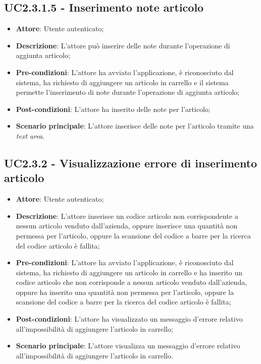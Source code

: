 \subsection{UC2.3.1.5 - Inserimento note articolo}

\begin{itemize}
	\item \textbf{Attore}: Utente autenticato;
	\item \textbf{Descrizione}: L'attore può inserire delle note durante l'operazione di aggiunta articolo;
	\item \textbf{Pre-condizioni}: L'attore ha avviato l'applicazione, è riconosciuto dal sistema, ha richiesto di aggiungere un articolo in carrello e il sistema permette l'inserimento di note durante l'operazione di aggiunta articolo;
	\item \textbf{Post-condizioni}: L'attore ha inserito delle note per l'articolo;
	\item \textbf{Scenario principale}: L'attore inserisce delle note per l'articolo tramite una \textit{text area}.
\end{itemize}

\subsection{UC2.3.2 - Visualizzazione errore di inserimento articolo}

\begin{itemize}
	\item \textbf{Attore}: Utente autenticato;
	\item \textbf{Descrizione}: L'attore inserisce un codice articolo non corrispondente a nessun articolo venduto dall'azienda, oppure inserisce una quantità non permessa per l'articolo, oppure la scansione del codice a barre per la ricerca del codice articolo è fallita;
	\item \textbf{Pre-condizioni}: L'attore ha avviato l'applicazione, è riconosciuto dal sistema, ha richiesto di aggiungere un articolo in carrello e ha inserito un codice articolo che non corrisponde a nessun articolo venduto dall'azienda, oppure ha inserito una quantità non permessa per l'articolo, oppure la scansione del codice a barre per la ricerca del codice articolo è fallita;
	\item \textbf{Post-condizioni}: L'attore ha visualizzato un messaggio d'errore relativo all'impossibilità di aggiungere l'articolo in carrello;
	\item \textbf{Scenario principale}: L'attore visualizza un messaggio d'errore relativo all'impossibilità di aggiungere l'articolo in carrello.
\end{itemize}

